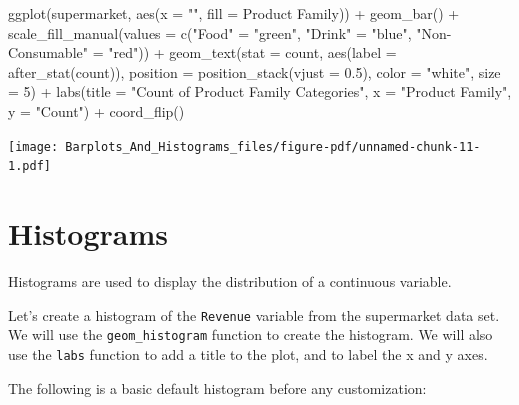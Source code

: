 \documentclass[
  letterpaper,
  DIV=11,
  numbers=noendperiod]{scrreprt}
\newenvironment{Shaded}{\begin{snugshade}}{\end{snugshade}}
\newcommand{\AttributeTok}[1]{\textcolor[rgb]{0.40,0.45,0.13}{#1}}
\newcommand{\DecValTok}[1]{\textcolor[rgb]{0.68,0.00,0.00}{#1}}
\newcommand{\FloatTok}[1]{\textcolor[rgb]{0.68,0.00,0.00}{#1}}
\newcommand{\FunctionTok}[1]{\textcolor[rgb]{0.28,0.35,0.67}{#1}}
\newcommand{\NormalTok}[1]{\textcolor[rgb]{0.00,0.23,0.31}{#1}}
\newcommand{\OtherTok}[1]{\textcolor[rgb]{0.00,0.23,0.31}{#1}}
\newcommand{\SpecialCharTok}[1]{\textcolor[rgb]{0.37,0.37,0.37}{#1}}
\newcommand{\StringTok}[1]{\textcolor[rgb]{0.13,0.47,0.30}{#1}}
\begin{document}
\begin{Shaded}
\begin{Highlighting}[]
\FunctionTok{ggplot}\NormalTok{(supermarket, }\FunctionTok{aes}\NormalTok{(}\AttributeTok{x =} \StringTok{""}\NormalTok{, }\AttributeTok{fill =} \StringTok{\textasciigrave{}}\AttributeTok{Product Family}\StringTok{\textasciigrave{}}\NormalTok{)) }\SpecialCharTok{+}
  \FunctionTok{geom\_bar}\NormalTok{() }\SpecialCharTok{+}
  \FunctionTok{scale\_fill\_manual}\NormalTok{(}\AttributeTok{values =} \FunctionTok{c}\NormalTok{(}\StringTok{"Food"} \OtherTok{=} \StringTok{"green"}\NormalTok{, }\StringTok{"Drink"} \OtherTok{=} \StringTok{"blue"}\NormalTok{, }\StringTok{"Non{-}Consumable"} \OtherTok{=} \StringTok{"red"}\NormalTok{)) }\SpecialCharTok{+}
  \FunctionTok{geom\_text}\NormalTok{(}\AttributeTok{stat =} \StringTok{\textquotesingle{}count\textquotesingle{}}\NormalTok{, }\FunctionTok{aes}\NormalTok{(}\AttributeTok{label =} \FunctionTok{after\_stat}\NormalTok{(count)), }\AttributeTok{position =} \FunctionTok{position\_stack}\NormalTok{(}\AttributeTok{vjust =} \FloatTok{0.5}\NormalTok{), }\AttributeTok{color =} \StringTok{"white"}\NormalTok{, }\AttributeTok{size =} \DecValTok{5}\NormalTok{) }\SpecialCharTok{+}
  \FunctionTok{labs}\NormalTok{(}\AttributeTok{title =} \StringTok{"Count of Product Family Categories"}\NormalTok{,}
       \AttributeTok{x =} \StringTok{"Product Family"}\NormalTok{,}
       \AttributeTok{y =} \StringTok{"Count"}\NormalTok{) }\SpecialCharTok{+}
  \FunctionTok{coord\_flip}\NormalTok{()}
\end{Highlighting}
\end{Shaded}

\texttt{[image: Barplots\_And\_Histograms\_files/figure-pdf/unnamed-chunk-11-1.pdf]}

\section*{Histograms}\label{histograms}


Histograms are used to display the distribution of a continuous
variable.

Let's create a histogram of the \texttt{Revenue} variable from the
supermarket data set. We will use the \texttt{geom\_histogram} function
to create the histogram. We will also use the \texttt{labs} function to
add a title to the plot, and to label the x and y axes.

The following is a basic default histogram before any customization:
\end{document}
